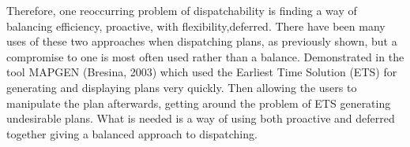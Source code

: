 Therefore, one reoccurring problem of dispatchability is finding a way
of balancing efficiency, proactive, with flexibility,deferred. There
have been many uses of these two approaches when dispatching plans, as
previously shown, but a compromise to one is most often used rather than
a balance. Demonstrated in the tool MAPGEN (Bresina, 2003) which used
the Earliest Time Solution (ETS) for generating and displaying plans
very quickly. Then allowing the users to manipulate the plan afterwards,
getting around the problem of ETS generating undesirable plans. What is
needed is a way of using both proactive and deferred together giving a
balanced approach to dispatching.

